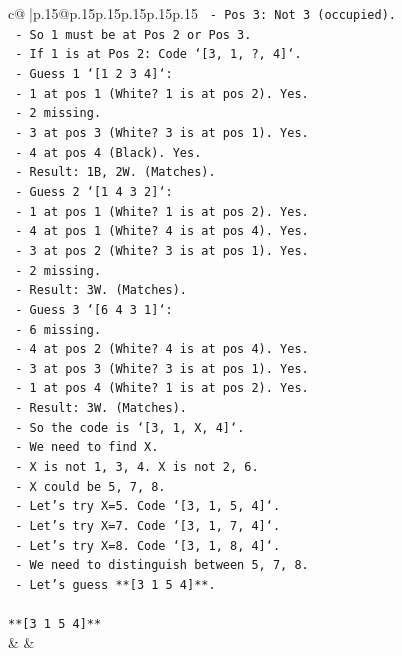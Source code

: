 \documentclass{article}
\begin{document}
{\begin{supertabular}{c@{$\;$}|p{.15\linewidth}@{}p{.15\linewidth}p{.15\linewidth}p{.15\linewidth}p{.15\linewidth}p{.15\linewidth}}
{{{\texttt{    {-} Pos 3: Not 3 (occupied).} \\
\texttt{    {-} So 1 must be at Pos 2 or Pos 3.} \\
\texttt{    {-} If 1 is at Pos 2: Code `{[}3, 1, ?, 4{]}`.} \\
\texttt{      {-} Guess 1 `{[}1 2 3 4{]}`:} \\
\texttt{        {-} 1 at pos 1 (White? 1 is at pos 2). Yes.} \\
\texttt{        {-} 2 missing.} \\
\texttt{        {-} 3 at pos 3 (White? 3 is at pos 1). Yes.} \\
\texttt{        {-} 4 at pos 4 (Black). Yes.} \\
\texttt{        {-} Result: 1B, 2W. (Matches).} \\
\texttt{      {-} Guess 2 `{[}1 4 3 2{]}`:} \\
\texttt{        {-} 1 at pos 1 (White? 1 is at pos 2). Yes.} \\
\texttt{        {-} 4 at pos 1 (White? 4 is at pos 4). Yes.} \\
\texttt{        {-} 3 at pos 2 (White? 3 is at pos 1). Yes.} \\
\texttt{        {-} 2 missing.} \\
\texttt{        {-} Result: 3W. (Matches).} \\
\texttt{      {-} Guess 3 `{[}6 4 3 1{]}`:} \\
\texttt{        {-} 6 missing.} \\
\texttt{        {-} 4 at pos 2 (White? 4 is at pos 4). Yes.} \\
\texttt{        {-} 3 at pos 3 (White? 3 is at pos 1). Yes.} \\
\texttt{        {-} 1 at pos 4 (White? 1 is at pos 2). Yes.} \\
\texttt{        {-} Result: 3W. (Matches).} \\
\texttt{    {-} So the code is `{[}3, 1, X, 4{]}`.} \\
\texttt{    {-} We need to find X.} \\
\texttt{    {-} X is not 1, 3, 4. X is not 2, 6.} \\
\texttt{    {-} X could be 5, 7, 8.} \\
\texttt{    {-} Let's try X=5. Code `{[}3, 1, 5, 4{]}`.} \\
\texttt{    {-} Let's try X=7. Code `{[}3, 1, 7, 4{]}`.} \\
\texttt{    {-} Let's try X=8. Code `{[}3, 1, 8, 4{]}`.} \\
\texttt{    {-} We need to distinguish between 5, 7, 8.} \\
\texttt{    {-} Let's guess **{[}3 1 5 4{]}**.} \\
\\ 
\texttt{**{[}3 1 5 4{]}**} \\
            }
        }
    }
    & & \\ \\


\end{supertabular}}
\end{document}
